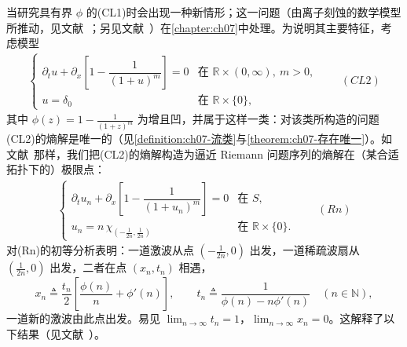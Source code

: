 \documentclass[../main.tex]{subfiles}
\begin{document}
当研究具有界 $\phi$ 的(CL1)时会出现一种新情形；这一问题（由离子刻蚀的数学模型所推动，见文献~\cite{ref88}；另见文献~\cite{ref50}）在\cref{chapter:ch07}中处理。为说明其主要特征，考虑模型
\begin{align*}
\begin{cases}
\partial_t u + \partial_x\left[1-\dfrac{1}{(1+u)^m}\right] = 0 & \text{在 }\mathbb{R}\times(0,\infty),\ m>0,\\
u=\delta_0 & \text{在 }\mathbb{R}\times\{0\},
\end{cases}
\qquad(CL2)
\end{align*}
其中 $\phi(z)=1-\frac{1}{(1+z)^m}$ 为增且凹，并属于这样一类：对该类所构造的问题(CL2)的熵解是唯一的（见\cref{definition:ch07-流类}与\cref{theorem:ch07-存在唯一}）。如文献~\cite{ref67}那样，我们把(CL2)的熵解构造为逼近 Riemann 问题序列的熵解在（某合适拓扑下的）极限点：
\begin{align*}
\begin{cases}
\partial_t u_n + \partial_x\left[1-\dfrac{1}{(1+u_n)^m}\right] = 0 & \text{在 }S,\\
u_n = n\,\chi_{(-\frac{1}{2n},\frac{1}{2n})} & \text{在 }\mathbb{R}\times\{0\}.
\end{cases}
\qquad(Rn)
\end{align*}
对(Rn)的初等分析表明：一道激波从点 $(-\frac{1}{2n},0)$ 出发，一道稀疏波扇从 $(\frac{1}{2n},0)$ 出发，二者在点 $(x_n,t_n)$ 相遇，
\[
x_n \triangleq  \frac{t_n}{2}\left[\frac{\phi(n)}{n}+\phi'(n)\right],
\qquad
t_n \triangleq  \frac{1}{\phi(n)-n\phi'(n)} \quad (n\in\mathbb{N}),
\]
一道新的激波由此点出发。易见 $\lim_{n\to\infty}t_n=1$，$\lim_{n\to\infty}x_n=0$。这解释了以下结果（见文献~\cite{ref18}）。
\end{document}
